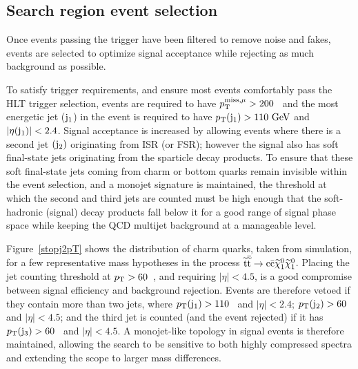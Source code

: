 \subsection{Search region event selection}

Once events passing the trigger have been filtered to remove noise and fakes, 
events are selected to optimize signal acceptance while rejecting as much background as possible.

To satisfy trigger requirements, and ensure most events comfortably pass the \ac{HLT} trigger selection, 
events are required to have $p^{\rm miss, \mu}_{\rm T} > 200$~\GeV{} and the most energetic jet (${\rm j}_1$) in the event is required 
to have $p_{\text{T}}({\rm j}_1)>110~\mathrm{GeV}$ and $|\eta({\rm j}{}_1)|<2.4$.
Signal acceptance is increased by allowing events where there is a second jet $({\rm j}_2)$ originating from \ac{ISR} (or \ac{FSR}); 
however the signal also has soft final-state jets originating from the sparticle decay products.
%
To ensure that these soft final-state jets coming from charm or bottom quarks remain invisible within the event selection,
%
and a monojet signature is maintained,
the \pt{} threshold at which the second and third jets are counted must be high enough that
the soft-hadronic (signal) decay products 
fall below it for a good range of signal phase space 
while keeping the QCD multijet background at a manageable level.

Figure~\ref{stopj2pT} shows the \pt{} distribution of charm quarks, taken from simulation, 
for a few representative mass hypotheses in the process $\widetilde{{\rm t}} \overline{\widetilde{\mathrm{t}}} \rightarrow \rm c \bar{\rm c} \widetilde{\chi}^{0}_{1} \widetilde{\chi}^{0}_{1}$.
%
Placing the jet counting threshold at $p_{\text{T}} >60$~\GeV, and requiring $|\eta| < 4.5$,
is a good compromise between signal efficiency and background rejection.
%
Events are therefore vetoed if they contain more than two jets,
where $p_{\text{T}}({\rm j}_{1})>110$~\GeV{} and $|\eta|<2.4$; $p_{\text{T}}({\rm j}_{2})>60$~\GeV{} and $|\eta|<4.5$; 
and the third jet is counted (and the event rejected) if it has $p_{\text{T}}({\rm j}_{3})>60$~\GeV{} and $|\eta|<4.5$.
A monojet-like topology in signal events is therefore maintained, 
allowing the search to be sensitive to both highly compressed spectra
and extending the scope to larger mass differences.  

